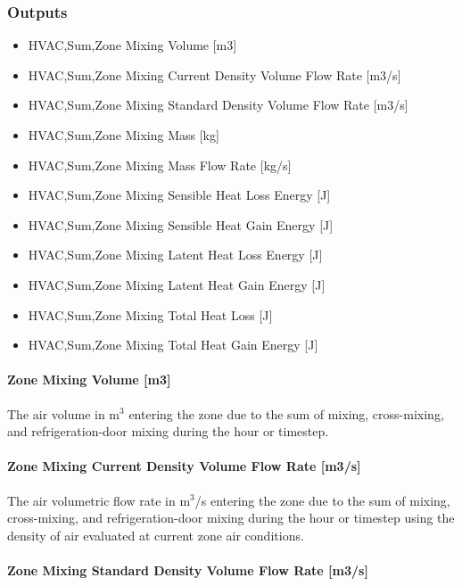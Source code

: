 \subsubsection{Outputs}\label{outputs-3-000}

\begin{itemize}
\item
  HVAC,Sum,Zone Mixing Volume {[}m3{]}
\item
  HVAC,Sum,Zone Mixing Current Density Volume Flow Rate {[}m3/s{]}
\item
  HVAC,Sum,Zone Mixing Standard Density Volume Flow Rate {[}m3/s{]}
\item
  HVAC,Sum,Zone Mixing Mass {[}kg{]}
\item
  HVAC,Sum,Zone Mixing Mass Flow Rate {[}kg/s{]}
\item
  HVAC,Sum,Zone Mixing Sensible Heat Loss Energy {[}J{]}
\item
  HVAC,Sum,Zone Mixing Sensible Heat Gain Energy {[}J{]}
\item
  HVAC,Sum,Zone Mixing Latent Heat Loss Energy {[}J{]}
\item
  HVAC,Sum,Zone Mixing Latent Heat Gain Energy {[}J{]}
\item
  HVAC,Sum,Zone Mixing Total Heat Loss {[}J{]}
\item
  HVAC,Sum,Zone Mixing Total Heat Gain Energy {[}J{]}
\end{itemize}

\paragraph{Zone Mixing Volume {[}m3{]}}\label{zone-mixing-volume-m3}

The air volume in m\(^{3}\) entering the zone due to the sum of mixing, cross-mixing, and refrigeration-door mixing during the hour or timestep.

\paragraph{Zone Mixing Current Density Volume Flow Rate {[}m3/s{]}}\label{zone-mixing-current-density-volumetric-flow-rate-m3s}

The air volumetric flow rate in m\(^{3}\)/s entering the zone due to the sum of mixing, cross-mixing, and refrigeration-door mixing during the hour or timestep using the density of air evaluated at current zone air conditions.

\paragraph{Zone Mixing Standard Density Volume Flow Rate {[}m3/s{]}}\label{zone-mixing-standard-density-volumetric-flow-rate-m3s}

